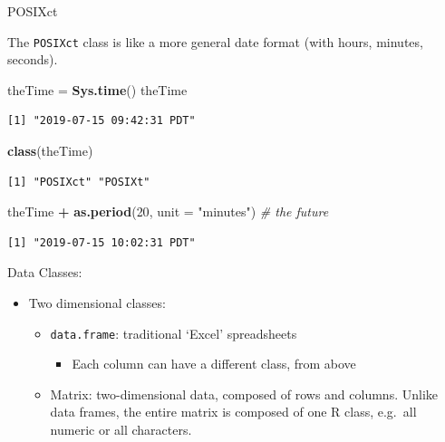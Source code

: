 \documentclass[
  ignorenonframetext,
]{beamer}
\newenvironment{Shaded}{\begin{snugshade}}{\end{snugshade}}
\newcommand{\CommentTok}[1]{\textcolor[rgb]{0.56,0.35,0.01}{\textit{#1}}}
\newcommand{\DataTypeTok}[1]{\textcolor[rgb]{0.13,0.29,0.53}{#1}}
\newcommand{\DecValTok}[1]{\textcolor[rgb]{0.00,0.00,0.81}{#1}}
\newcommand{\KeywordTok}[1]{\textcolor[rgb]{0.13,0.29,0.53}{\textbf{#1}}}
\newcommand{\NormalTok}[1]{#1}
\newcommand{\OperatorTok}[1]{\textcolor[rgb]{0.81,0.36,0.00}{\textbf{#1}}}
\newcommand{\StringTok}[1]{\textcolor[rgb]{0.31,0.60,0.02}{#1}}
\providecommand{\tightlist}{%
  \setlength{\itemsep}{0pt}\setlength{\parskip}{0pt}}
\begin{document}
\begin{frame}[fragile]{POSIXct}
\protect\hypertarget{posixct}{}

The \texttt{POSIXct} class is like a more general date format (with
hours, minutes, seconds).

\begin{Shaded}
\begin{Highlighting}[]
\NormalTok{theTime =}\StringTok{ }\KeywordTok{Sys.time}\NormalTok{()}
\NormalTok{theTime}
\end{Highlighting}
\end{Shaded}

\begin{verbatim}
[1] "2019-07-15 09:42:31 PDT"
\end{verbatim}

\begin{Shaded}
\begin{Highlighting}[]
\KeywordTok{class}\NormalTok{(theTime)}
\end{Highlighting}
\end{Shaded}

\begin{verbatim}
[1] "POSIXct" "POSIXt" 
\end{verbatim}

\begin{Shaded}
\begin{Highlighting}[]
\NormalTok{theTime }\OperatorTok{+}\StringTok{ }\KeywordTok{as.period}\NormalTok{(}\DecValTok{20}\NormalTok{, }\DataTypeTok{unit =} \StringTok{"minutes"}\NormalTok{) }\CommentTok{# the future}
\end{Highlighting}
\end{Shaded}

\begin{verbatim}
[1] "2019-07-15 10:02:31 PDT"
\end{verbatim}

\end{frame}

\begin{frame}[fragile]{Data Classes:}
\protect\hypertarget{data-classes-2}{}

\begin{itemize}
\tightlist
\item
  Two dimensional classes:

  \begin{itemize}
  \tightlist
  \item
    \texttt{data.frame}: traditional `Excel' spreadsheets

    \begin{itemize}
    \tightlist
    \item
      Each column can have a different class, from above
    \end{itemize}
  \item
    Matrix: two-dimensional data, composed of rows and columns. Unlike
    data frames, the entire matrix is composed of one R class, e.g.~all
    numeric or all characters.
  \end{itemize}
\end{itemize}

\end{frame}
\end{document}

